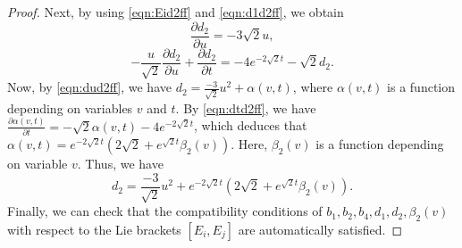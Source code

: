 \documentclass[reqno]{amsart}%
\theoremstyle{definition}
\numberwithin{equation}{section}
\begin{document}
\begin{proof}
Next, by using \eqref{eqn:Eid2ff} and \eqref{eqn:d1d2ff}, we obtain
\begin{equation}\label{eqn:dud2ff}
\frac{\partial d_2}{\partial u}=-3\sqrt{2}u,
\end{equation}
\begin{equation}\label{eqn:dtd2ff}
-\frac{u}{\sqrt{2}}\frac{\partial d_2}{\partial u}+\frac{\partial d_2}{\partial t}=
-4e^{-2\sqrt{2}t}-\sqrt{2}d_2.
\end{equation}
Now, by \eqref{eqn:dud2ff}, we have $d_2=\frac{-3}{\sqrt{2}}u^2+\alpha(v,t)$,
where $\alpha(v,t)$ is a function depending on variables $v$ and $t$.
By \eqref{eqn:dtd2ff}, we have $\frac{\partial \alpha(v,t)}{\partial t}=-\sqrt{2}\alpha(v,t)-4e^{-2\sqrt{2}t}$, which deduces that
$\alpha(v,t)=e^{-2\sqrt{2}t}(2\sqrt{2}+e^{\sqrt{2}t}\beta_2(v))$.
Here, $\beta_2(v)$ is a function depending on variable $v$.
Thus, we have
$$
d_2=\frac{-3}{\sqrt{2}}u^2+e^{-2\sqrt{2}t}(2\sqrt{2}+e^{\sqrt{2}t}\beta_2(v)).
$$
Finally, we can check that the compatibility conditions of  $b_1,b_2,b_4,d_1,d_2,\beta_2(v)$  with respect to the Lie brackets $[E_i,E_j]$ are automatically satisfied.



\end{proof}
\end{document}
